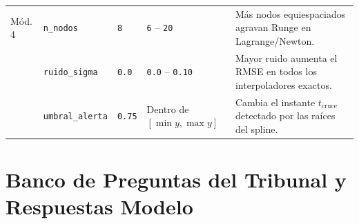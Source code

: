 \documentclass[11pt,a4paper]{article}
\begin{document}
\begin{table}[h!]
{\begin{tabular}{lllp{4.2cm}p{5.5cm}}
\midrule
Mód. 4 & \texttt{n\_nodos} & \texttt{8} & \texttt{6} -- \texttt{20} & Más nodos equiespaciados agravan Runge en Lagrange/Newton. \\
 & \texttt{ruido\_sigma} & \texttt{0.0} & \texttt{0.0} -- \texttt{0.10} & Mayor ruido aumenta el RMSE en todos los interpoladores exactos. \\
 & \texttt{umbral\_alerta} & \texttt{0.75} & Dentro de $[\min y, \max y]$ & Cambia el instante $t_{\text{cruce}}$ detectado por las raíces del spline. \\
\bottomrule
\end{tabular}%
}
\end{table}

\section{Banco de Preguntas del Tribunal y Respuestas Modelo}
\end{document}
